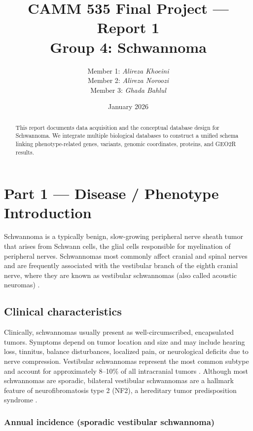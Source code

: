 \documentclass[11pt]{article}
\title{CAMM 535 Final Project — Report 1\\Group 4: Schwannoma}
\author{
	Member 1: \textit{Alireza Khoeini} \\
	Member 2: \textit{Alireza Noroozi} \\
	Member 3: \textit{Ghada Bahlul}
}
\date{January 2026}
\begin{document}
	\maketitle
	
	\begin{abstract}
		This report documents data acquisition and the conceptual database design for Schwannoma.
		We integrate multiple biological databases to construct a unified schema linking phenotype-related
		genes, variants, genomic coordinates, proteins, and GEO2R results.
	\end{abstract}
	
	\tableofcontents
	\newpage
	
	\section{Part 1 — Disease / Phenotype Introduction}\label{sec:intro}
	Schwannoma is a typically benign, slow-growing peripheral nerve sheath tumor that arises
	from Schwann cells, the glial cells responsible for myelination of peripheral nerves.
	Schwannomas most commonly affect cranial and spinal nerves and are frequently associated
	with the vestibular branch of the eighth cranial nerve, where they are known as vestibular
	schwannomas (also called acoustic neuromas) \cite{review_schwannoma_2020}.
	
	\subsection{Clinical characteristics}
	Clinically, schwannomas usually present as well-circumscribed, encapsulated tumors.
	Symptoms depend on tumor location and size and may include hearing loss, tinnitus,
	balance disturbances, localized pain, or neurological deficits due to nerve compression.
	Vestibular schwannomas represent the most common subtype and account for approximately
	8--10\% of all intracranial tumors \cite{vestibular_epidemiology_2019}.
	Although most schwannomas are sporadic, bilateral vestibular schwannomas are a hallmark
	feature of neurofibromatosis type 2 (NF2), a hereditary tumor predisposition syndrome
	\cite{omim_nf2}.
	\subsubsection{Annual incidence (sporadic vestibular schwannoma)}
	
\end{document}
